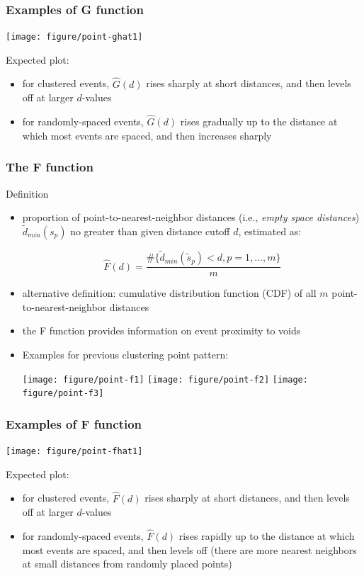 \documentclass[10pt]{beamer}\usepackage[]{graphicx}\usepackage[]{color}
\newcommand{\bitemize}{\begin{itemize}}
\newcommand{\eitemize}{\end{itemize}}
\newcommand{\bblock}{\begin{block}}
\newcommand{\eblock}{\end{block}}
\begin{document}
\begin{frame}
\frametitle{Examples of G function}


{\centering \texttt{[image: figure/point-ghat1]} 

}




\bblock{Expected plot: }
\bitemize
\item for clustered events, $\hat{G}(d)$ rises sharply at short distances, and
then levels off at larger $d$-values
\item for randomly-spaced events, $\hat{G}(d)$ rises gradually up to the distance
at which most events are spaced, and then increases sharply
\eitemize
\eblock
\end{frame}

\begin{frame}
\frametitle{The F function}
\bblock{Definition}
\bitemize
\item proportion of point-to-nearest-neighbor distances (i.e., {\it empty space distances}) $\tilde{d}_{min}(s_p)$
no greater than given distance cutoff $d$, estimated as:

\[
\hat{F}(d) = \frac{\#\{\tilde{d}_{min}(\tilde{s}_p)<d, p = 1, \ldots, m\}}{m}
\]
\item alternative definition: cumulative distribution function
(CDF) of all $m$ point-to-nearest-neighbor distances
\item the F function provides information on event proximity to voids
\item Examples for previous clustering point pattern:


{\centering \texttt{[image: figure/point-f1]} 
\texttt{[image: figure/point-f2]} 
\texttt{[image: figure/point-f3]} 

}




\eitemize
\eblock
\end{frame}

\begin{frame}
\frametitle{Examples of F function}


{\centering \texttt{[image: figure/point-fhat1]} 

}




\bblock{Expected plot: }
\bitemize
\item for clustered events, $\hat{F}(d)$ rises sharply at short distances, and
then levels off at larger $d$-values

\item for randomly-spaced events, $\hat{F}(d)$ rises rapidly up to the distance at
which most events are spaced, and then levels off (there are more
nearest neighbors at small distances from randomly placed points)
\eitemize
\eblock
\end{frame}
\end{document}
